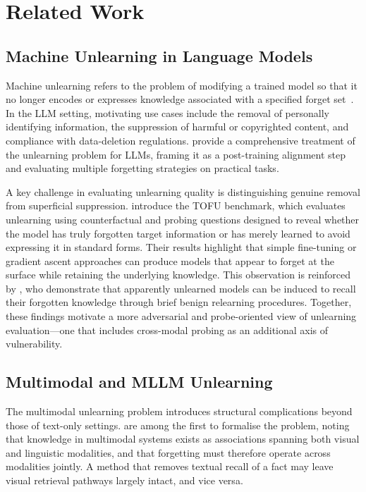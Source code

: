 \documentclass[12pt, a4paper]{article}
\begin{document}
\section{Related Work}
\label{sec:related}

\subsection{Machine Unlearning in Language Models}

Machine unlearning refers to the problem of modifying a trained model so that it no
longer encodes or expresses knowledge associated with a specified forget
set~\citep{llmunlearning2024}.
In the LLM setting, motivating use cases include the removal of personally identifying
information, the suppression of harmful or copyrighted content, and compliance with
data-deletion regulations.
\citet{llmunlearning2024} provide a comprehensive treatment of the unlearning problem
for LLMs, framing it as a post-training alignment step and evaluating multiple forgetting
strategies on practical tasks.

A key challenge in evaluating unlearning quality is distinguishing genuine removal from
superficial suppression.
\citet{tofu2024} introduce the TOFU benchmark, which evaluates unlearning using
counterfactual and probing questions designed to reveal whether the model has
truly forgotten target information or has merely learned to avoid expressing it in
standard forms.
Their results highlight that simple fine-tuning or gradient ascent approaches can produce
models that appear to forget at the surface while retaining the underlying knowledge.
This observation is reinforced by \citet{relearning2024}, who demonstrate that apparently
unlearned models can be induced to recall their forgotten knowledge through brief benign
relearning procedures.
Together, these findings motivate a more adversarial and probe-oriented view of
unlearning evaluation---one that includes cross-modal probing as an additional axis of
vulnerability.

\subsection{Multimodal and MLLM Unlearning}

The multimodal unlearning problem introduces structural complications beyond those of
text-only settings.
\citet{multidelete2023} are among the first to formalise the problem, noting that
knowledge in multimodal systems exists as associations spanning both visual and
linguistic modalities, and that forgetting must therefore operate across modalities
jointly.
A method that removes textual recall of a fact may leave visual retrieval pathways
largely intact, and vice versa.
\end{document}
